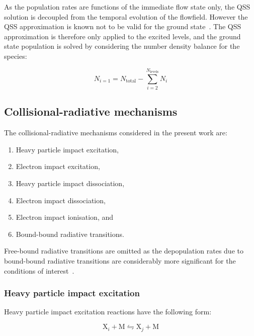 As the population rates are functions of the immediate flow state only, the QSS solution is decoupled from the temporal evolution of the flowfield.
However the QSS approximation is known not to be valid for the ground state~\cite{park_1990}.
The QSS approximation is therefore only applied to the excited levels, and the ground state population is solved by considering the number density balance for the species:

\begin{equation}
 N_{i=1} = N_\text{total} - \sum_{i=2}^{N_\text{levels}} N_i \label{eq:QSS_closure}
\end{equation}

\subsection{Collisional-radiative mechanisms}

The collisional-radiative mechanisms considered in the present work are:

\begin{enumerate}
 \item Heavy particle impact excitation,
 \item Electron impact excitation,
 \item Heavy particle impact dissociation,
 \item Electron impact dissociation,
 \item Electron impact ionisation, and
 \item Bound-bound radiative transitions.
\end{enumerate}

Free-bound radiative transitions are omitted as the depopulation rates due to bound-bound radiative transitions are considerably more significant for the conditions of interest~\cite{JohnPhd}.


\subsubsection{Heavy particle impact excitation}

Heavy particle impact excitation reactions have the following form:

\begin{equation}
 \text{X}_i + \text{M} \leftrightharpoons  \text{X}_j + \text{M}
\end{equation}

